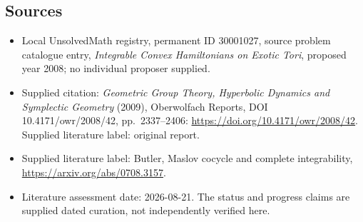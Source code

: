 \documentclass[11pt]{article}
\begin{document}
\subsection{Sources}
\begin{itemize}\item Local UnsolvedMath registry, permanent ID 30001027, source problem catalogue entry, \emph{Integrable Convex Hamiltonians on Exotic Tori}, proposed year 2008; no individual proposer supplied.\item Supplied citation: \emph{Geometric Group Theory, Hyperbolic Dynamics and Symplectic Geometry} (2009), Oberwolfach Reports, DOI 10.4171/owr/2008/42, pp.\ 2337--2406: \url{https://doi.org/10.4171/owr/2008/42}. Supplied literature label: original report.\item Supplied literature label: Butler, Maslov cocycle and complete integrability, \url{https://arxiv.org/abs/0708.3157}.\item Literature assessment date: 2026-08-21. The status and progress claims are supplied dated curation, not independently verified here.\end{itemize}
\end{document}
